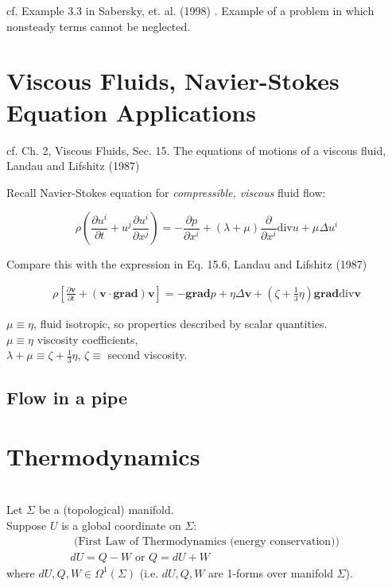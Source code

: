 \documentclass[10pt]{amsart}
\begin{document}
\begin{multicols*}{2}
cf. Example 3.3 in Sabersky, et. al. (1998) \cite{SAHG1998}. Example of a problem in which nonsteady terms cannot be neglected. 

\section{Viscous Fluids, Navier-Stokes Equation Applications}

cf. Ch. 2, Viscous Fluids, Sec. 15. The equations of motions of a viscous fluid, Landau and Lifshitz (1987) \cite{LLandauELifshitz1987}

Recall Navier-Stokes equation for \emph{compressible, viscous} fluid flow:

\begin{equation}
\boxed{
\rho \left( \frac{\partial u^i }{ \partial t} + u^j \frac{ \partial u^i }{ \partial x^j } \right) = - \frac{ \partial p }{ \partial x^i } + (\lambda + \mu ) \frac{\partial }{ \partial x^i } \text{div} u + \mu \Delta u^i
}
\end{equation}

Compare this with the expression in Eq. 15.6, Landau and Lifshitz (1987) \cite{LLandauELifshitz1987}

\begin{equation}
\begin{gathered}
	\rho \left[ \frac{ \partial \mathbf{v}}{ \partial t } + (\mathbf{v} \cdot \textbf{grad} ) \mathbf{v} \right] = -\textbf{grad} p + \eta \Delta \mathbf{v} + (\zeta + \frac{1}{3} \eta) \textbf{grad} \text{div} \mathbf{v}
\end{gathered}
\end{equation}

$\mu \equiv \eta$, fluid isotropic, so properties described by scalar quantities. \\
$\mu \equiv \eta$ viscosity coefficients, \\
$\lambda + \mu \equiv \zeta + \frac{1}{3} \eta$, $\zeta \equiv $ second viscosity.

\subsection{Flow in a pipe}



\section{Thermodynamics}

\quad \\ 
Let $\Sigma$ be a (topological) manifold. \\
Suppose $U$ is a global coordinate on $\Sigma$:
\begin{equation}
\begin{gathered}
\text{ (First Law of Thermodynamics (energy conservation)) } \\
\boxed{ dU = Q - W \text{ or } Q = dU + W }
\end{gathered}
\end{equation}
where $dU, Q, W \in \Omega^1(\Sigma)$ (i.e. $dU, Q, W$ are 1-forms over manifold $\Sigma$).


\end{multicols*}
\end{document}
